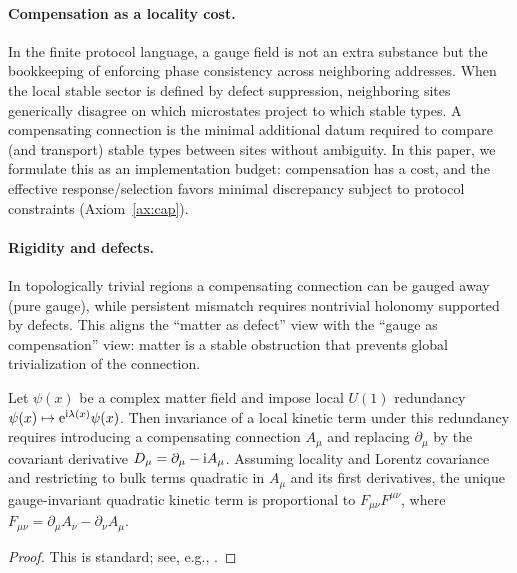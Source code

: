 \paragraph{Compensation as a locality cost.}
In the finite protocol language, a gauge field is not an extra substance but the bookkeeping of enforcing phase consistency across neighboring addresses.
When the local stable sector is defined by defect suppression, neighboring sites generically disagree on which microstates project to which stable types.
A compensating connection is the minimal additional datum required to compare (and transport) stable types between sites without ambiguity.
In this paper, we formulate this as an implementation budget: compensation has a cost, and the effective response/selection favors minimal discrepancy subject to protocol constraints (Axiom~\ref{ax:cap}).

\paragraph{Rigidity and defects.}
In topologically trivial regions a compensating connection can be gauged away (pure gauge), while persistent mismatch requires nontrivial holonomy supported by defects.
This aligns the ``matter as defect'' view with the ``gauge as compensation'' view: matter is a stable obstruction that prevents global trivialization of the connection.

\begin{proposition}\label{prop:local_rephasing_connection}
Let $\psi(x)$ be a complex matter field and impose local $U(1)$ redundancy $\psi(x)\mapsto \mathrm{e}^{\mathrm{i}\lambda(x)}\psi(x)$.
Then invariance of a local kinetic term under this redundancy requires introducing a compensating connection $A_\mu$ and replacing $\partial_\mu$ by the covariant derivative $D_\mu=\partial_\mu-\mathrm{i} A_\mu$.
Assuming locality and Lorentz covariance and restricting to bulk terms quadratic in $A_\mu$ and its first derivatives, the unique gauge-invariant quadratic kinetic term is proportional to $F_{\mu\nu}F^{\mu\nu}$, where $F_{\mu\nu}=\partial_\mu A_\nu-\partial_\nu A_\mu$.
\end{proposition}
\begin{proof}
This is standard; see, e.g., \cite{Weyl1929,PeskinSchroeder1995,WeinbergQFT1995}.
\end{proof}

